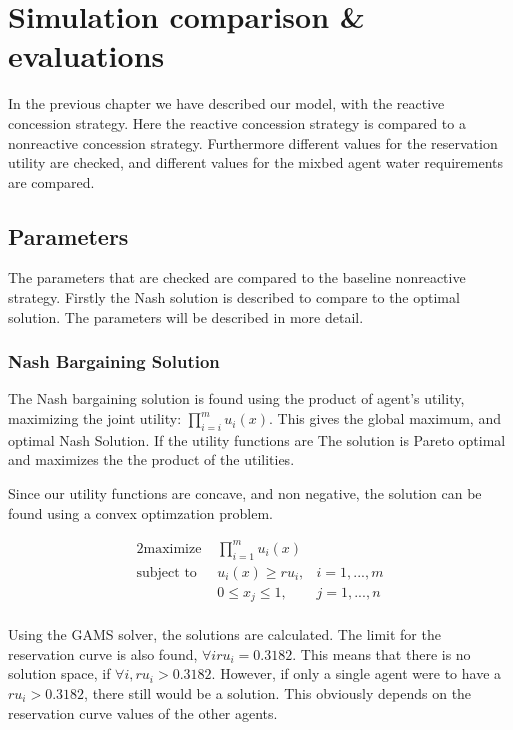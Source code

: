 \chapter{Simulation comparison \& evaluations}
In the previous chapter we have described our model, with the reactive concession strategy. Here the reactive concession strategy is compared to a nonreactive concession strategy. Furthermore different values for the reservation utility are checked, and different values for the mixbed agent water requirements are compared. 

\section{Parameters}
The parameters that are checked are compared to the baseline nonreactive strategy. Firstly the Nash solution is described to compare to the optimal solution. The parameters will be described in more detail.

\subsection{Nash Bargaining Solution}
The Nash bargaining solution is found using the product of agent's utility, maximizing the joint utility: $\prod_{i=i}^{m}u_i(x).$ This gives the global maximum, and optimal Nash Solution. If the utility functions are The solution is Pareto optimal and maximizes the the product of the utilities. 

Since our utility functions are concave, and non negative, the solution can be found using a convex optimzation problem. 

\begin{alignat*}{2}
\text{maximize }   	& \prod_{i=1}^m u_i(x)  \\
\text{subject to \ } 	& u_i(x) \geq ru_i, & i = 1,...,m\\
& 0\leq x_j\leq 1, & j = 1,...,n\\
\end{alignat*}

Using the GAMS solver, the solutions are calculated. The limit for the reservation curve is also found, $\forall i ru_i = 0.3182$. This means that there is no solution space, if $\forall i, ru_i > 0.3182$. However, if only a single agent were to have a $ru_i > 0.3182$, there still would be a solution. This obviously depends on the reservation curve values of the other agents. 

